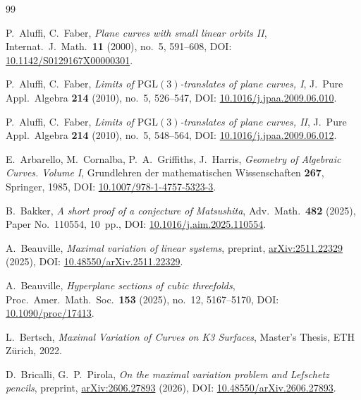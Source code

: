 \documentclass[a4paper,12pt,twoside,reqno]{amsart}
\numberwithin{equation}{section}
\theoremstyle{plain}
\theoremstyle{definition}
\theoremstyle{plain}
\theoremstyle{definition}
\begin{document}
\begin{thebibliography}{99}

P.~Aluffi, C.~Faber, \emph{Plane curves with small linear orbits II}, Internat.\ J.\ Math.\ \textbf{11} (2000), no.\ 5, 591--608, DOI: \href{https://doi.org/10.1142/S0129167X00000301}{10.1142/S0129167X00000301}.

P.~Aluffi, C.~Faber, \emph{Limits of $\mathrm{PGL}(3)$-translates of plane curves, I}, J.\ Pure Appl.\ Algebra \textbf{214} (2010), no.\ 5, 526--547, DOI: \href{https://doi.org/10.1016/j.jpaa.2009.06.010}{10.1016/j.jpaa.2009.06.010}.

P.~Aluffi, C.~Faber, \emph{Limits of $\mathrm{PGL}(3)$-translates of plane curves, II}, J.\ Pure Appl.\ Algebra \textbf{214} (2010), no.\ 5, 548--564, DOI: \href{https://doi.org/10.1016/j.jpaa.2009.06.012}{10.1016/j.jpaa.2009.06.012}.

E.~Arbarello, M.~Cornalba, P.~A.~Griffiths, J.~Harris, \emph{Geometry of Algebraic Curves. Volume I}, Grundlehren der mathematischen Wissenschaften \textbf{267}, Springer, 1985, DOI: \href{https://doi.org/10.1007/978-1-4757-5323-3}{10.1007/978-1-4757-5323-3}.

B.~Bakker, \emph{A short proof of a conjecture of Matsushita}, Adv.\ Math.\ \textbf{482} (2025), Paper No.~110554, 10~pp., DOI: \href{https://doi.org/10.1016/j.aim.2025.110554}{10.1016/j.aim.2025.110554}.



A.~Beauville, \emph{Maximal variation of linear systems}, preprint, \href{https://arxiv.org/abs/2511.22329}{arXiv:2511.22329} (2025), DOI: \href{https://doi.org/10.48550/arXiv.2511.22329}{10.48550/arXiv.2511.22329}.

A.~Beauville, \emph{Hyperplane sections of cubic threefolds}, Proc.\ Amer.\ Math.\ Soc.\ \textbf{153} (2025), no.\ 12, 5167--5170, DOI: \href{https://doi.org/10.1090/proc/17413}{10.1090/proc/17413}.

L.~Bertsch, \emph{Maximal Variation of Curves on K3 Surfaces}, Master's Thesis, ETH Z\"urich, 2022.

D.~Bricalli, G.~P.~Pirola, \emph{On the maximal variation problem and Lefschetz pencils}, preprint, \href{https://arxiv.org/abs/2606.27893}{arXiv:2606.27893} (2026), DOI: \href{https://doi.org/10.48550/arXiv.2606.27893}{10.48550/arXiv.2606.27893}.




\end{thebibliography}
\end{document}
